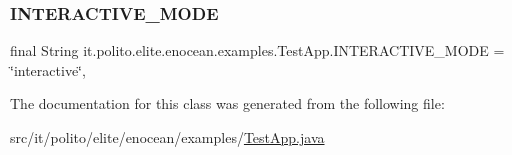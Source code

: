 \subsubsection{\texorpdfstring{I\+N\+T\+E\+R\+A\+C\+T\+I\+V\+E\+\_\+\+M\+O\+DE}{INTERACTIVE\_MODE}}
{\footnotesize\ttfamily final String it.\+polito.\+elite.\+enocean.\+examples.\+Test\+App.\+I\+N\+T\+E\+R\+A\+C\+T\+I\+V\+E\+\_\+\+M\+O\+DE = \char`\"{}interactive\char`\"{}\hspace{0.3cm}{\ttfamily [static]}, {\ttfamily [protected]}}



The documentation for this class was generated from the following file\+:\begin{DoxyCompactItemize}
\item 
src/it/polito/elite/enocean/examples/\hyperlink{_test_app_8java}{Test\+App.\+java}\end{DoxyCompactItemize}
